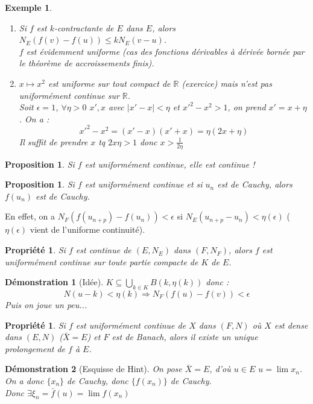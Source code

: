 \documentclass[a4paper, oneside]{report}
\theoremstyle{break}
\newtheorem{propr}[thm]{Propriété}
\newtheorem{propo}[thm]{Proposition}
\newtheorem{exem}[thm]{Exemple}
\newtheorem*{demo}{Démonstration}
\newcommand{\R}{\mathbb{R}}
\newcommand{\unifcont}{uniformément continue }
\newcommand{\fracun}[1]{\frac{1}{#1}}
\begin{document}
\begin{exem}
\begin{enumerate}
\item Si $f$ est $k$-contractante de $E$ dans $E$, alors $N_E(f(v)-f(u))\leq k N_E(v-u)$.\\
$f$ est évidemment uniforme (cas des fonctions dérivables à dérivée bornée par le théorème de accroissements finis).

\item $x\mapsto x^2$ est uniforme sur tout compact de $\R$ (exercice) mais n'est pas uniformément continue sur $\R$.\\
Soit $\epsilon = 1$, $\forall \eta>0$ $x',x$ avec $|x'-x|<\eta$ et $x'^2-x^2>1$, on prend $x' = x+\eta $. On a :
$$x'^2-x^2=(x'-x)(x'+x)=\eta (2x+\eta)$$
Il suffit de prendre $x$ tq $2x\eta >1$ donc $x>\fracun{2\eta}$
\end{enumerate}
\end{exem}

\begin{propo}
Si $f$ est uniformément continue, elle est continue !
\end{propo}

\begin{propo}
Si $f$ est uniformément continue et si $u_n$ est de Cauchy, alors $f(u_n)$ est de Cauchy.
\end{propo}

En effet, on a $N_F(f(u_{n+p})-f(u_n))<\epsilon$ si $N_E(u_{n+p}-u_n)<\eta(\epsilon)$ ($\eta(\epsilon)$ vient de l'uniforme continuité).

\begin{propr}
Si $f$ est continue de $(E,N_E)$ dans $(F,N_F)$, alors $f$ est uniformément continue sur toute partie compacte de $K$ de $E$.
\end{propr}

\begin{demo}[Idée]
$K\subseteq \bigcup_{k \in K}B(k,\eta(k))$ donc :
$$N(u-k)<\eta(k) \Rightarrow N_F(f(u)-f(v))<\epsilon$$
Puis on joue un peu...
\end{demo}

\begin{propr}
Si $f$ est \unifcont de $X$ dans $(F,N)$ où $X$ est dense dans $(E,N)$ ($\bar{X}=E$) et $F$ est de Banach, alors il existe un unique prolongement de $f$ à $E$.
\end{propr}

\begin{demo}[Esquisse de Hint]
On pose $\bar{X}=E$, d'où $u\in E$ $u=\lim x_n$.
On a donc $\{x_n\}$ de Cauchy, donc $\{f(x_n)\}$ de Cauchy.\\
Donc $\exists \xi_n=\bar{f}(u)=\lim f(x_n)$
\end{demo}
\end{document}
